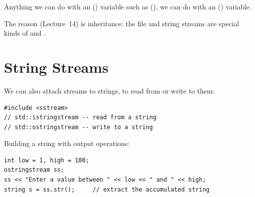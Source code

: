 \begin{important}
Anything we can do with an  () variable such as
 (), we can do with an  ()
variable.
\end{important}
The reason (Lecture~14) is inheritance: the file and string streams are special kinds of
 and .
\begin{center}
\end{center}

\section{String Streams}
We can also attach streams to strings, to read from or write to them:
\begin{lstlisting}[style=cpp]
#include <sstream>
// std::istringstream -- read from a string
// std::ostringstream -- write to a string
\end{lstlisting}

Building a string with output operations:
\begin{lstlisting}[style=cpp]
int low = 1, high = 100;
ostringstream ss;
ss << "Enter a value between " << low << " and " << high;
string s = ss.str();     // extract the accumulated string
\end{lstlisting}

